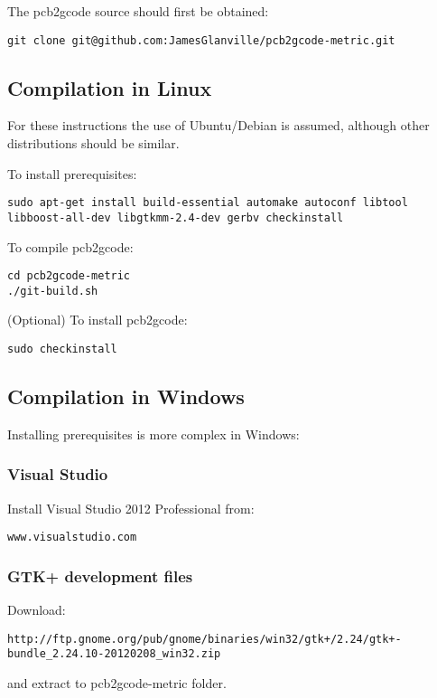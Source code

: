 \documentclass[a4paper,11pt]{article}  %
\begin{document}
The pcb2gcode source should first be obtained:
\begin{lstlisting}[frame=single,breaklines=true]
git clone git@github.com:JamesGlanville/pcb2gcode-metric.git
\end{lstlisting}

\subsection{Compilation in Linux}
For these instructions the use of Ubuntu/Debian is assumed, although other distributions should be similar.

To install prerequisites:
\begin{lstlisting}[frame=single,breaklines=true]
sudo apt-get install build-essential automake autoconf libtool libboost-all-dev libgtkmm-2.4-dev gerbv checkinstall
\end{lstlisting}

To compile pcb2gcode:
\begin{lstlisting}[frame=single,breaklines=true]
cd pcb2gcode-metric
./git-build.sh
\end{lstlisting}

(Optional) To install pcb2gcode:
\begin{lstlisting}[frame=single,breaklines=true]
sudo checkinstall
\end{lstlisting}

\subsection{Compilation in Windows}
Installing prerequisites is more complex in Windows:

\subsubsection{Visual Studio}
Install Visual Studio 2012 Professional from:
\begin{lstlisting}[frame=single,breaklines=true]
www.visualstudio.com
\end{lstlisting}

\subsubsection{GTK+ development files}
Download:
\begin{lstlisting}[frame=single,breaklines=true]
http://ftp.gnome.org/pub/gnome/binaries/win32/gtk+/2.24/gtk+-bundle_2.24.10-20120208_win32.zip
\end{lstlisting}
and extract to pcb2gcode-metric folder.
\end{document}
